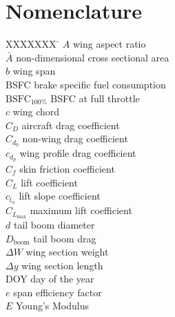 \section*{Nomenclature}

\begin{multicols}{2}
\small

\begin{tabbing}
  XXXXXXX \= \kill%
$A$ \> wing aspect ratio \\
$\bar{A}$ \> non-dimensional cross sectional area \\
$b$ \> wing span \\ %
BSFC \> brake specific fuel consumption \\ %
$\text{BSFC}_{100\%}$ \> BSFC at full throttle \\ %
$c$ \> wing chord \\ %
$C_D$ \> aircraft drag coefficient \\
$C_{d_0}$ \> non-wing drag coefficient \\
$c_{d_p}$ \> wing profile drag coefficient \\
$C_f$ \> skin friction coefficient \\
$C_L$ \> lift coefficient \\
$c_{l_{\alpha}}$ \> lift slope coefficient \\
$C_{L_{\text{max}}}$ \> maximum lift coefficient \\
$d$ \> tail boom diameter \\ %
$D_{\text{boom}}$ \> tail boom drag \\%
$\Delta W$ \> wing section weight \\ %
$\Delta y$ \> wing section length \\ %
DOY \> day of the year \\
$e$ \> span efficiency factor \\
$E$ \> Young's Modulus \\ %

\end{tabbing}
\end{multicols}
